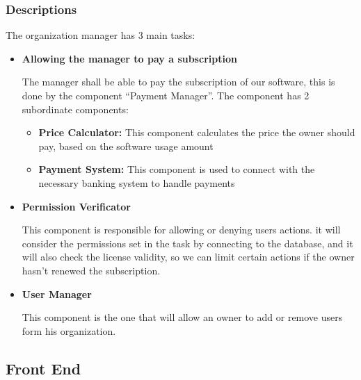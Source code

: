 \documentclass{article}
\begin{document}
\subsubsection{Descriptions}

The organization manager has 3 main tasks:
\begin{itemize}
    \item \textbf{Allowing the manager to pay a subscription}

    The manager shall be able to pay the subscription of our software, this is done by the component ``Payment Manager''.
    The component has 2 subordinate components:
    \begin{itemize}
        \item \textbf{Price Calculator: } This component calculates the price the owner should pay, based on the software usage amount
        \item \textbf{Payment System: } This component is used to connect with the necessary banking system to handle payments
    \end{itemize}

    \item \textbf{Permission Verificator}

    This component is responsible for allowing or denying users actions. it will consider the permissions set in the task by connecting to the database,
    and it will also check the license validity, so we can limit certain actions if the owner hasn't renewed the subscription.

    \item \textbf{User Manager}
    
    This component is the one that will allow an owner to add or remove users form his organization.
\end{itemize}


\subsection{Front End}
\end{document}
